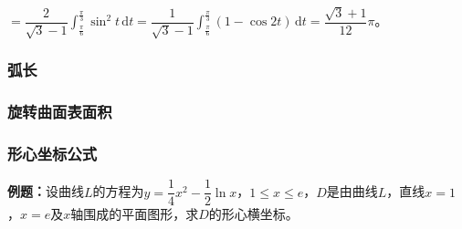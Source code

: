 \documentclass[UTF8, 12pt]{ctexart}
\begin{document}
$=\dfrac{2}{\sqrt{3}-1}\int_\frac{\pi}{6}^\frac{\pi}{3}\sin^2t\,\textrm{d}t=\dfrac{1}{\sqrt{3}-1}\int_\frac{\pi}{6}^\frac{\pi}{3}(1-\cos2t)\,\textrm{d}t=\dfrac{\sqrt{3}+1}{12}\pi$。

\subsubsection{弧长}




\subsubsection{旋转曲面表面积}

\subsubsection{形心坐标公式}




\textbf{例题：}设曲线$L$的方程为$y=\dfrac{1}{4}x^2-\dfrac{1}{2}\ln x$，$1\leqslant x\leqslant e$，$D$是由曲线$L$，直线$x=1$，$x=e$及$x$轴围成的平面图形，求$D$的形心横坐标。
\end{document}

